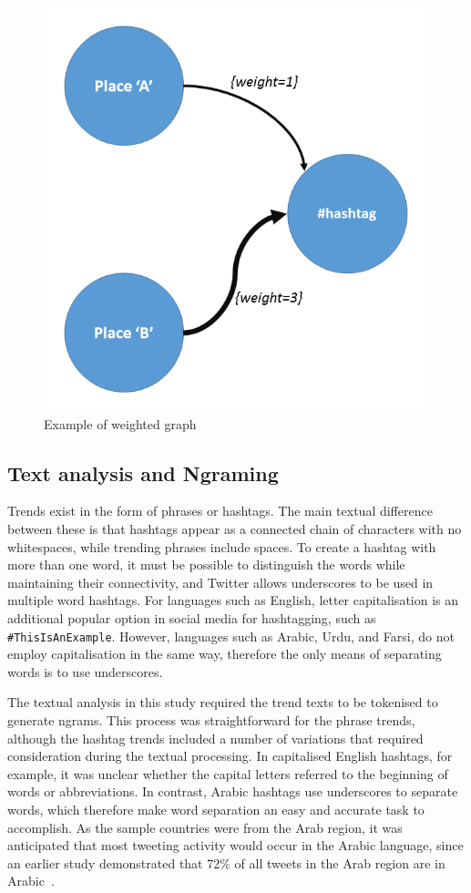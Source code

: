 \documentclass[utf8]{frontiersSCNS} %
\begin{document}
\begin{figure}[!ht] \centering
\includegraphics[width=\columnwidth]{images/w_graph.png}
\caption{Example of weighted graph}
\label{fig:w_graph}
\end{figure}


\subsection{Text analysis and Ngraming}

Trends exist in the form of phrases or hashtags. The main textual difference between these is that hashtags appear as a connected chain of characters with no whitespaces, while trending phrases include spaces. To create a hashtag with more than one word, it must be possible to distinguish the words while maintaining their connectivity, and Twitter allows underscores to be used in multiple word hashtags. For languages such as English, letter capitalisation is an additional popular option in social media for hashtagging, such as {\texttt{\#ThisIsAnExample}}. However, languages such as Arabic, Urdu, and Farsi, do not employ capitalisation in the same way, therefore the only means of separating words is to use underscores.

The textual analysis in this study required the trend texts to be tokenised to generate ngrams. This process was straightforward for the phrase trends, although the hashtag trends included a number of variations that required consideration during the textual processing. In capitalised English hashtags, for example, it was unclear whether the capital letters referred to the beginning of words or abbreviations. In contrast, Arabic hashtags use underscores to separate words, which therefore make word separation an easy and accurate task to accomplish. As the sample countries were from the Arab region, it was anticipated that most tweeting activity would occur in the Arabic language, since an earlier study demonstrated that 72\% of all tweets in the Arab region are in Arabic~\cite{Salem2017}.
\end{document}
